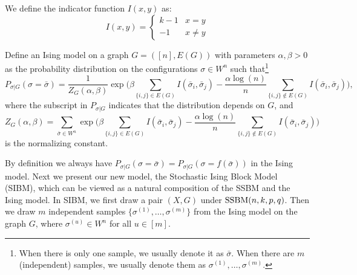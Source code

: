 \documentclass{article}
\begin{document}
We define the indicator function $I(x, y)$ as:
\begin{equation}
I(x, y) = \begin{cases}
 k-1 & x = y \\
 -1 & x \neq y
\end{cases}
\end{equation}

 
 \begin{definition}
Define an Ising model on a graph $G=([n],E(G))$ with parameters $\alpha,\beta>0$ as the probability distribution on the configurations $\sigma\in W^n$ such that\footnote{When there is only one sample, we usually denote it as $\bar{\sigma}$. When there are $m$ (independent) samples, we usually denote them as $\sigma^{(1)},\dots,\sigma^{(m)}$.}
\begin{equation} \label{eq:isingma}
P_{\sigma|G}(\sigma=\bar{\sigma})=\frac{1}{Z_G(\alpha,\beta)}
\exp\Big(\beta\sum_{\{i,j\}\in E(G)} I(\bar{\sigma}_i ,\bar{\sigma}_j)
-\frac{\alpha\log(n)}{n} \sum_{\{i,j\}\notin E(G)} I(\bar{\sigma}_i, \bar{\sigma}_j)\Big) ,
\end{equation}
where the subscript in $P_{\sigma|G}$ indicates that the distribution depends on $G$, and 
\begin{equation}  \label{eq:zg}
Z_G(\alpha,\beta)=\sum_{\bar{\sigma} \in W^n} \exp\Big(\beta\sum_{\{i,j\}\in E(G)}I(\bar{\sigma}_i, \bar{\sigma}_j)
-\frac{\alpha\log(n)}{n} \sum_{\{i,j\}\notin E(G)} I(\bar{\sigma}_i, \bar{\sigma}_j) \Big) 
\end{equation}
is the normalizing constant.
\end{definition}






By definition we always have $P_{\sigma|G}(\sigma=\bar{\sigma})=P_{\sigma|G}(\sigma=f(\bar{\sigma}))$ in the Ising model. Next we present our new model, the Stochastic Ising Block Model (SIBM), which can be viewed as a natural composition of the SSBM and the Ising model. In SIBM, we first draw a pair $(X,G)$ under $\operatorname{SSBM}(n,k, p,q)$.  Then we draw $m$ independent samples $\{\sigma^{(1)},\dots,\sigma^{(m)}\}$ from the Ising model on the graph $G$, where $\sigma^{(u)}\in W^n$ for all $u\in[m]$.
\end{document}
